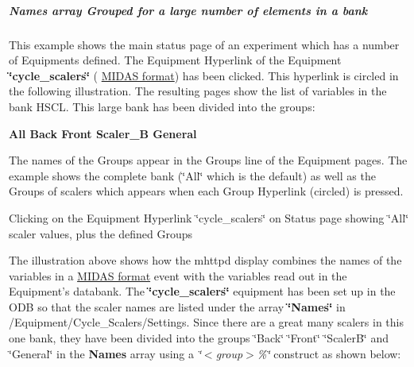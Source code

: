 \par


\par
\hypertarget{RC_mhttpd_Equipment_page_RC_mhttpd_Equipment_example5}{}\subparagraph{Names array Grouped for a large number of elements in a bank}\label{RC_mhttpd_Equipment_page_RC_mhttpd_Equipment_example5}
This example shows the main status page of an experiment which has a number of Equipments defined. The Equipment Hyperlink of the Equipment {\bfseries \char`\"{}cycle\_\-scalers\char`\"{}} ( \hyperlink{FE_bank_construction_FE_MIDAS_event_construction}{MIDAS format}) has been clicked. This hyperlink is circled in the following illustration. The resulting pages show the list of variables in the bank HSCL. This large bank has been divided into the groups:


\begin{DoxyItemize}
\item {\bfseries  All Back Front Scaler\_\-B General}
\end{DoxyItemize}

The names of the Groups appear in the Groups line of the Equipment pages. The example shows the complete bank (\char`\"{}All\char`\"{} which is the default) as well as the Groups of scalers which appears when each Group Hyperlink (circled) is pressed.

\label{RC_mhttpd_Equipment_page_RC_mhttpd_Equipment_image5}
\hypertarget{RC_mhttpd_Equipment_page_RC_mhttpd_Equipment_image5}{}
 \par
\par
\par
 \begin{center}  Clicking on the Equipment Hyperlink \char`\"{}cycle\_\-scalers\char`\"{} on Status page showing \char`\"{}All\char`\"{} scaler values, plus the defined Groups \par
\par
\par
  \end{center}  \par
\par
\par


\par


The illustration above shows how the mhttpd display combines the names of the variables in a \hyperlink{FE_bank_construction_FE_MIDAS_event_construction}{MIDAS format} event with the variables read out in the Equipment's databank. The {\bfseries \char`\"{}cycle\_\-scalers\char`\"{}} equipment has been set up in the ODB so that the scaler names are listed under the array {\bfseries \char`\"{}Names\char`\"{}} in /Equipment/Cycle\_\-Scalers/Settings. Since there are a great many scalers in this one bank, they have been divided into the groups \char`\"{}Back\char`\"{} \char`\"{}Front\char`\"{} \char`\"{}ScalerB\char`\"{} and \char`\"{}General\char`\"{} in the {\bfseries Names} array using a {\itshape \char`\"{}$<$group$>$\%\char`\"{}\/} construct as shown below:


